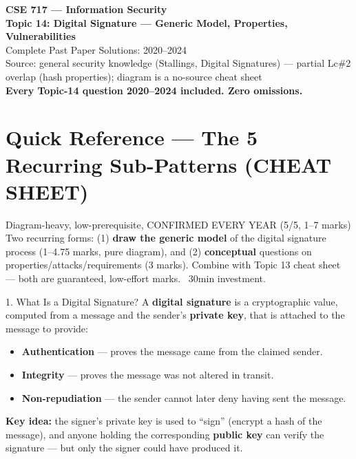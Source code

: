 \documentclass[12pt,a4paper]{article}
\begin{document}
\begin{center}
{\LARGE\bfseries\color{folblue} CSE 717 --- Information Security}\\[4pt]
{\large\bfseries Topic 14: Digital Signature --- Generic Model, Properties, Vulnerabilities}\\[2pt]
{\large Complete Past Paper Solutions: 2020--2024}\\[6pt]
{\normalsize Source: general security knowledge (Stallings, Digital Signatures) --- partial Lc\#2 overlap (hash properties); diagram is a no-source cheat sheet}\\[2pt]
{\normalsize\color{darkred}\textbf{Every Topic-14 question 2020--2024 included. Zero omissions.}}
\end{center}

\tableofcontents
\newpage

\section*{Quick Reference --- The 5 Recurring Sub-Patterns (CHEAT SHEET)}

\begin{warnbox}{Diagram-heavy, low-prerequisite, CONFIRMED EVERY YEAR (5/5, 1--7 marks)}
Two recurring forms: (1) \textbf{draw the generic model} of the digital signature process (1--4.75 marks, pure diagram), and (2) \textbf{conceptual} questions on properties/attacks/requirements (3 marks). Combine with Topic 13 cheat sheet --- both are guaranteed, low-effort marks. ~30min investment.
\end{warnbox}

\begin{algobox}{1. What Is a Digital Signature?}
A \textbf{digital signature} is a cryptographic value, computed from a message and the sender's \textbf{private key}, that is attached to the message to provide:
\begin{itemize}[noitemsep]
  \item \textbf{Authentication} --- proves the message came from the claimed sender.
  \item \textbf{Integrity} --- proves the message was not altered in transit.
  \item \textbf{Non-repudiation} --- the sender cannot later deny having sent the message.
\end{itemize}
\textbf{Key idea:} the signer's private key is used to ``sign'' (encrypt a hash of the message), and anyone holding the corresponding \textbf{public key} can verify the signature --- but only the signer could have produced it.
\end{algobox}
\end{document}
